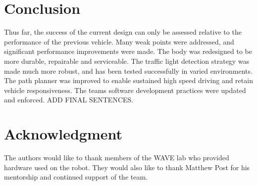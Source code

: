 \documentclass[11pt,journal]{IEEEtran}
\begin{document}
\section{Conclusion}
Thus far, the success of the current design can only be assessed relative to the performance of the previous vehicle. Many weak points were addressed, and significant performance improvements were made. The body was redesigned to be more durable, repairable  and serviceable. The traffic light detection strategy was made much more robust, and has been tested successfully in varied environments. The path planner was improved to enable sustained high speed driving and retain vehicle responsiveness. The teams software development practices were updated and enforced. ADD FINAL SENTENCES.




%


\section*{Acknowledgment}

The authors would like to thank members of the WAVE lab who provided hardware used on the robot. They would also like to thank Matthew Post for his mentorship and continued support of the team.
\end{document}
